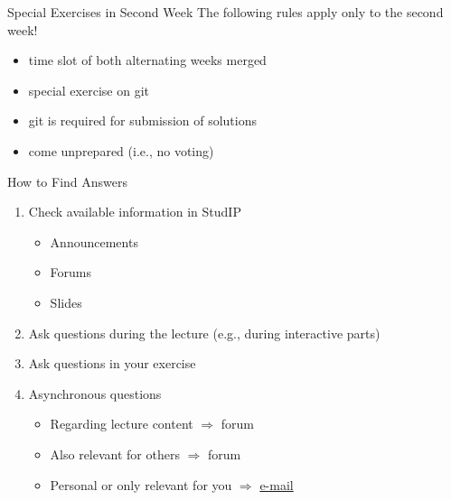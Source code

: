 \begin{frame}{\insertsubsection}
	\begin{fancycolumns}
		\begin{definition}{Special Exercises in Second Week}
			The following rules apply only to the second week!
			\begin{itemize}
				\item time slot of both alternating weeks merged
				\item special exercise on git
				\item git is required for submission of solutions
				\item come unprepared (i.e., no voting)
			\end{itemize}
		\end{definition}
		\nextcolumn
		\begin{note}{How to Find Answers}
			\begin{enumerate}
				\item Check available information in StudIP
				\begin{itemize}
					\item Announcements
					\item Forums
					\item Slides
				\end{itemize}
				\item Ask questions during the lecture (e.g., during interactive parts)
				\item Ask questions in your exercise
				\item Asynchronous questions
				\begin{itemize}
					\item Regarding lecture content $\Rightarrow$ forum
					\item Also relevant for others $\Rightarrow$ forum
					\item Personal or only relevant for you $\Rightarrow$ \href{mailto:christopher.rau@tu-braunschweig.de?cc=chico.sundermann@tu-braunschweig.de&subject=[SE1]}{e-mail}
				\end{itemize}
			\end{enumerate}
		\end{note}
	\end{fancycolumns}
\end{frame}

